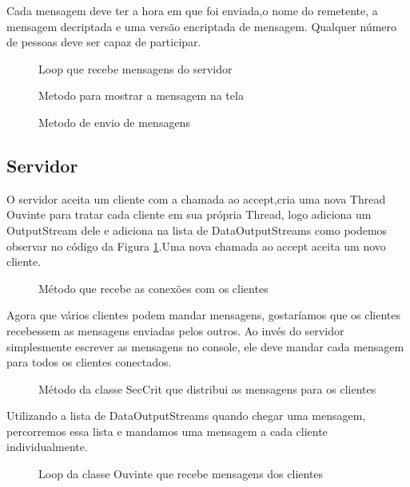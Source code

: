 \documentclass[a4paper,12pt]{article}
\begin{document}
Cada mensagem deve ter a hora em que foi enviada,o nome do remetente, a mensagem decriptada e uma versão encriptada de mensagem. Qualquer número de pessoas deve ser capaz de participar.
\begin{figure}[H]

\caption{Loop que recebe mensagens do servidor}
\end{figure}


\begin{figure}[H]

\caption{Metodo para mostrar a mensagem na tela}
\end{figure}

\begin{figure}[H]

\caption{Metodo de envio de mensagens}
\end{figure}

\subsection{Servidor}
O servidor aceita um cliente com a chamada ao accept,cria uma nova Thread Ouvinte para tratar cada cliente em sua própria Thread, logo adiciona um OutputStream dele e adiciona na lista de DataOutputStreams como podemos observar no código da Figura \ref{fig7}.Uma nova chamada ao accept aceita um novo cliente.
\begin{figure}[H]

\caption{Método que recebe as conexões com os clientes}
\label{fig7}
\end{figure}
Agora que vários clientes podem mandar mensagens, gostaríamos que os clientes recebessem as mensagens enviadas pelos outros. Ao invés do servidor simplesmente escrever as mensagens no console, ele deve mandar cada mensagem para todos os clientes conectados.
\begin{figure}[H]
	
	\caption{Método da classe SecCrit que distribui as mensagens para os clientes}
	\label{fig8}
\end{figure}

Utilizando a lista de DataOutputStreams quando chegar uma mensagem, percorremos essa lista e mandamos uma mensagem a cada cliente individualmente.
\begin{figure}[H]

\caption{Loop da classe Ouvinte que recebe mensagens dos clientes}
\label{fig10}
\end{figure}
\end{document}
